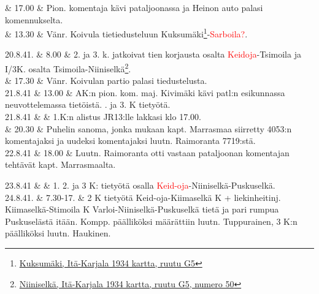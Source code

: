 \documentclass[11pt,a5paper,oneside]{book}
\begin{document}
& 17.00 & Pion. komentaja kävi pataljoonassa ja Heinon auto palasi komennukselta. \\

& 13.30 & Vänr. Koivula tietiedusteluun Kuksumäki\footnote{\href{https://www.google.fi/maps/place/\%D0\%9A\%D1\%83\%CC\%81\%D0\%BA\%D1\%88\%D0\%B5\%D0\%B3\%D0\%BE\%D1\%80\%D1\%8B,+Republic+of+Karelia,+Russia,+186006/}{Kuksumäki, Itä-Karjala 1934 kartta, ruutu G5}}-\textcolor{red}{Sarboila?}. \\

\taulustop


20.8.41. & 8.00 & 2. ja 3. k. jatkoivat tien korjausta osalta \textcolor{red}{Keidoja}-Tsimoila ja I/3K. osalta Tsimoila-Niiniselkä\footnote{\href{https://www.google.fi/maps/place/61\%C2\%B017'48.2\%22N+32\%C2\%B052'52.5\%22E/@61.296723,32.8790573,904m/}{Niiniselkä, Itä-Karjala 1934 kartta, ruutu G5, numero 50}}. \\

& 17.30 & Vänr. Koivulan partio palasi tiedustelusta. \newline\newline\newline \\

21.8.41 & 13.00 &  AK:n pion. kom. maj. Kivimäki kävi patl:n esikunnassa neuvottelemassa tietöistä. . ja 3. K tietyötä. \newline \\

21.8.41 & & 1.K:n alistus JR13:lle lakkasi klo 17.00. \\

& 20.30 & Puhelin sanoma, jonka mukaan kapt. Marrasmaa siirretty 4053:n komentajaksi ja uudeksi komentajaksi luutn. Raimoranta 7719:stä. \newline \\

22.8.41 & 18.00 & Luutn. Raimoranta otti vastaan pataljoonan komentajan tehtävät kapt. Marrasmaalta. \\
\newpage

23.8.41 & & 1. 2. ja 3 K: tietyötä osalla \textcolor{red}{Keid-oja}-Niiniselkä-Puskuselkä. \newline\newline \\

24.8.41. & 7.30-17. & 2 K tietyötä Keid-oja-Kiimaselkä  K + liekinheitinj. Kiimaselkä-Stimoila  K Varloi-Niiniselkä-Puskuselkä tietä ja pari rumpua Puskuselästä itään.  Kompp. päälliköksi määrättiin luutn. Tuppurainen, 3 K:n päälliköksi luutn. Haukinen. \newline \\
\end{document}
